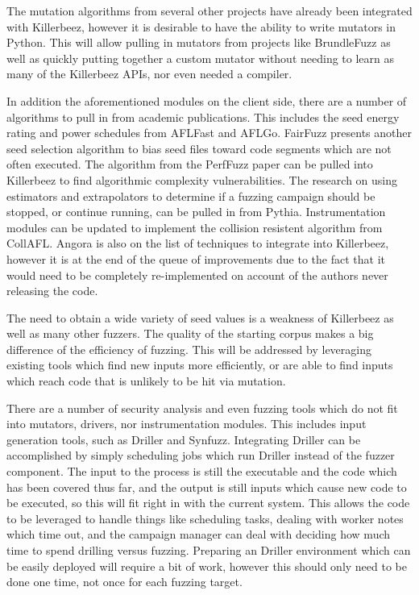 The mutation algorithms from several other projects have already been
integrated with Killerbeez, however it is desirable to have the ability
to write mutators in Python.  This will allow pulling in mutators from
projects like BrundleFuzz\cite{brundlefuzz} as well as quickly putting
together a custom mutator without needing to learn as many of the Killerbeez
APIs, nor even needed a compiler.

In addition the aforementioned modules on the client side, there are a number
of algorithms to pull in from academic publications.  This includes the seed
energy rating and power schedules from AFLFast\cite{aflfast} and
AFLGo.\cite{aflgo} FairFuzz presents another seed selection algorithm to bias
seed files toward code segments which are not often executed.\cite{fairfuzz}
The algorithm from the PerfFuzz\cite{perffuzz} paper can be pulled into
Killerbeez to find algorithmic complexity vulnerabilities. The research on
using estimators and extrapolators to determine if a fuzzing campaign should
be stopped, or continue running, can be pulled in from Pythia.\cite{pythia}
Instrumentation modules can be updated to implement the collision resistent
algorithm from CollAFL.\cite{collafl} Angora is also on the list of techniques
to integrate into Killerbeez, however it is at the end of the queue of
improvements due to the fact that it would need to be completely re-implemented
on account of the authors never releasing the code.\cite{angora}

The need to obtain a wide variety of seed values is a weakness of Killerbeez
as well as many other fuzzers. The quality of the starting corpus makes a big
difference of the efficiency of fuzzing. This will be addressed by leveraging
existing tools which find new inputs more efficiently, or are able to find
inputs which reach code that is unlikely to be hit via mutation.

There are a number of security analysis and even fuzzing tools which do not
fit into mutators, drivers, nor instrumentation modules. This includes input
generation tools, such as Driller\cite{driller} and Synfuzz\cite{synfuzz}.
Integrating Driller can be accomplished by simply scheduling \BOINC{} jobs
which run Driller instead of the fuzzer component. The input to the process
is still the executable and the code which has been covered thus far, and the
output is still inputs which cause new code to be executed, so this will fit
right in with the current system.  This allows the \BOINC{} code to be
leveraged to handle things like scheduling tasks, dealing with worker notes
which time out, and the campaign manager can deal with deciding how much time
to spend drilling versus fuzzing. Preparing an Driller environment which can
be easily deployed will require a bit of work, however this should only need
to be done one time, not once for each fuzzing target.

